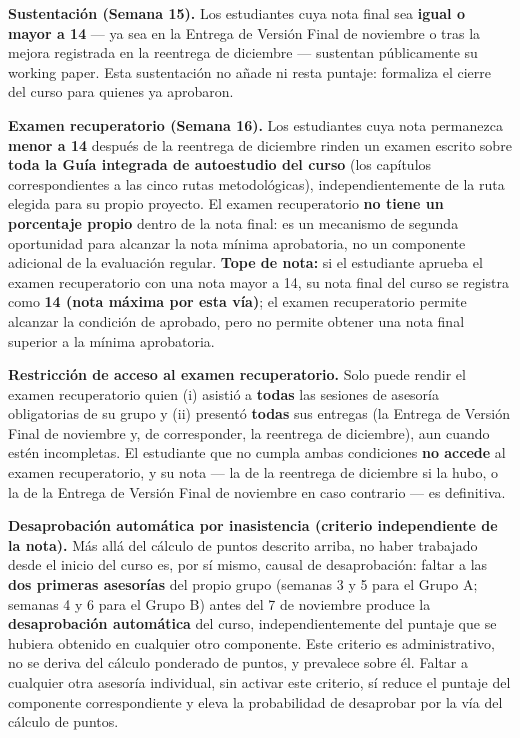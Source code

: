 \documentclass[11pt,a4paper]{article}
\begin{document}
\noindent
\textbf{Sustentación (Semana 15).} Los estudiantes cuya nota final sea \textbf{igual o mayor a 14} --- ya sea en la Entrega de Versión Final de noviembre o tras la mejora registrada en la reentrega de diciembre --- sustentan públicamente su working paper. Esta sustentación no añade ni resta puntaje: formaliza el cierre del curso para quienes ya aprobaron.

\noindent
\textbf{Examen recuperatorio (Semana 16).} Los estudiantes cuya nota permanezca \textbf{menor a 14} después de la reentrega de diciembre rinden un examen escrito sobre \textbf{toda la Guía integrada de autoestudio del curso} (los capítulos correspondientes a las cinco rutas metodológicas), independientemente de la ruta elegida para su propio proyecto. El examen recuperatorio \textbf{no tiene un porcentaje propio} dentro de la nota final: es un mecanismo de segunda oportunidad para alcanzar la nota mínima aprobatoria, no un componente adicional de la evaluación regular. \textbf{Tope de nota:} si el estudiante aprueba el examen recuperatorio con una nota mayor a 14, su nota final del curso se registra como \textbf{14 (nota máxima por esta vía)}; el examen recuperatorio permite alcanzar la condición de aprobado, pero no permite obtener una nota final superior a la mínima aprobatoria.

\noindent
\textbf{Restricción de acceso al examen recuperatorio.} Solo puede rendir el examen recuperatorio quien (i) asistió a \textbf{todas} las sesiones de asesoría obligatorias de su grupo y (ii) presentó \textbf{todas} sus entregas (la Entrega de Versión Final de noviembre y, de corresponder, la reentrega de diciembre), aun cuando estén incompletas. El estudiante que no cumpla ambas condiciones \textbf{no accede} al examen recuperatorio, y su nota --- la de la reentrega de diciembre si la hubo, o la de la Entrega de Versión Final de noviembre en caso contrario --- es definitiva.

\noindent
\textbf{Desaprobación automática por inasistencia (criterio independiente de la nota).} Más allá del cálculo de puntos descrito arriba, no haber trabajado desde el inicio del curso es, por sí mismo, causal de desaprobación: faltar a las \textbf{dos primeras asesorías} del propio grupo (semanas 3 y 5 para el Grupo A; semanas 4 y 6 para el Grupo B) antes del 7 de noviembre produce la \textbf{desaprobación automática} del curso, independientemente del puntaje que se hubiera obtenido en cualquier otro componente. Este criterio es administrativo, no se deriva del cálculo ponderado de puntos, y prevalece sobre él. Faltar a cualquier otra asesoría individual, sin activar este criterio, sí reduce el puntaje del componente correspondiente y eleva la probabilidad de desaprobar por la vía del cálculo de puntos.
\end{document}
